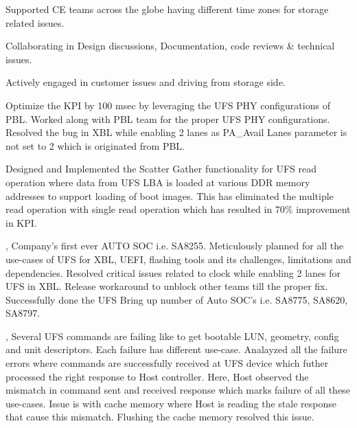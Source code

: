 \begin{itemize}
{      \item \noindent Supported CE teams across the globe having different time zones for storage related issues.
      \item \noindent Collaborating in Design discussions, Documentation, code reviews \& technical issues.
      \item \noindent Actively engaged in customer issues and driving from storage side.
      \item {} Optimize the KPI by 100 msec by leveraging the UFS PHY configurations of PBL. Worked along with PBL team for the proper UFS PHY configurations. Resolved the bug in XBL while enabling 2 lanes as PA\_Avail Lanes parameter is not set to 2 which is originated from PBL.
      \item {} Designed and Implemented the Scatter Gather functionality for UFS read operation where data from UFS LBA is loaded at various DDR memory addresses to support loading of boot images. This has eliminated the multiple read operation with single read operation which has resulted in 70\% improvement in KPI.
      \item {}, Company's first ever AUTO SOC i.e. SA8255. Meticulously planned for all the use-cases of UFS for XBL, UEFI, flashing tools and its challenges, limitations and dependencies. Resolved critical issues related to clock while enabling 2 lanes for UFS in XBL. Release workaround to unblock other teams till the proper fix.  Successfully done the UFS Bring up number of Auto SOC's i.e. SA8775, SA8620, SA8797.
      \item {}, Several UFS commands are failing like to get bootable LUN, geometry, config and unit descriptors. Each failure has different use-case. Analayzed all the failure errors where commands are successfully received at UFS device which futher processed the right response to Host controller. Here, Host observed the mismatch in command sent and received response which marks failure of all these use-cases. Issue is with cache memory where Host is reading the stale response that cause this mismatch. Flushing the cache memory resolved this issue.
}
\end{itemize}
